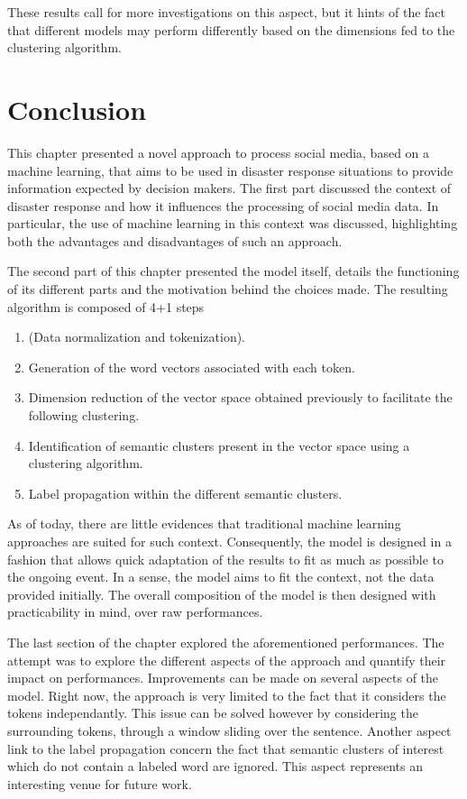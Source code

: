 These results call for more investigations on this aspect, but it hints of the fact
that different models may perform differently based on the dimensions fed to the clustering
algorithm.

\section*{Conclusion}
This chapter presented a novel approach to process social media, based on a machine learning,
that aims to be used in disaster response situations to provide information expected by
decision makers.
The first part discussed the context of disaster response and how it influences
the processing of social media data.
In particular, the use of machine learning in this context was discussed, highlighting both the advantages and disadvantages of such an approach.

The second part of this chapter presented the model itself, details the functioning of its
different parts and the motivation behind the choices made.
The resulting algorithm is composed of 4+1 steps

\begin{enumerate}
    \item (Data normalization and tokenization).
    \item Generation of the word vectors associated with each token.
    \item Dimension reduction of the vector space obtained previously to facilitate the following clustering.
    \item Identification of semantic clusters present in the vector space using a clustering algorithm.
    \item Label propagation within the different semantic clusters.
\end{enumerate}

As of today, there are little evidences that traditional machine learning approaches are
suited for such context.
Consequently, the model is designed in a fashion that allows quick adaptation of the
results to fit as much as possible to the ongoing event.
In a sense, the model aims to fit the context, not the data provided initially.
The overall composition of the model is then designed with practicability in mind, over
raw performances.

The last section of the chapter explored the aforementioned performances.
The attempt was to explore the different aspects of the approach and quantify their impact
on performances.
Improvements can be made on several aspects of the model.
Right now, the approach is very limited to the fact that it considers the tokens independantly.
This issue can be solved however by considering the surrounding tokens, through a window
sliding over the sentence.
Another aspect link to the label propagation concern the fact that semantic clusters of
interest which do not contain a labeled word are ignored.
This aspect represents an interesting venue for future work.

